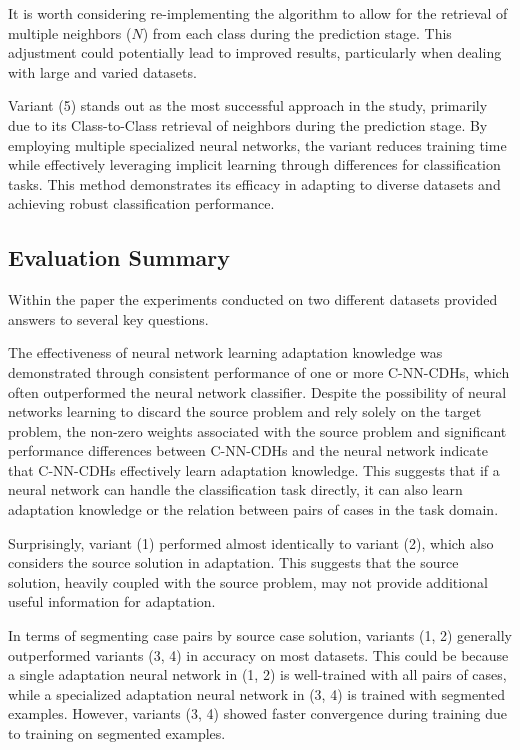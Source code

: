 \documentclass[a4paper, 12pt]{report}
\begin{document}
It is worth considering re-implementing the algorithm to allow for the retrieval of multiple neighbors ($N$) from each class during the prediction stage. 
This adjustment could potentially lead to improved results, particularly when dealing with large and varied datasets.

Variant (5) stands out as the most successful approach in the study, primarily due to its Class-to-Class retrieval of neighbors during the prediction stage. 
By employing multiple specialized neural networks, the variant reduces training time while effectively leveraging implicit learning through differences for classification tasks.
This method demonstrates its efficacy in adapting to diverse datasets and achieving robust classification performance.
\subsection{Evaluation Summary}
Within the paper \cite{ye2021learning} the experiments conducted on two different datasets provided answers to several key questions.

The effectiveness of neural network learning adaptation knowledge was demonstrated through consistent performance of one or more C-NN-CDHs,
which often outperformed the neural network classifier. Despite the possibility of neural networks learning to discard the source problem and rely solely on the target problem,
the non-zero weights associated with the source problem and significant performance differences between C-NN-CDHs and the neural network indicate that C-NN-CDHs effectively learn adaptation knowledge.
This suggests that if a neural network can handle the classification task directly, it can also learn adaptation knowledge or the relation between pairs of cases in the task domain.

Surprisingly, variant (1) performed almost identically to variant (2),
which also considers the source solution in adaptation.
This suggests that the source solution, heavily coupled with the source problem, may not provide additional useful information for adaptation.

In terms of segmenting case pairs by source case solution, variants (1, 2) generally outperformed variants (3, 4) in accuracy on most datasets.
This could be because a single adaptation neural network in (1, 2) is well-trained with all pairs of cases, while a specialized adaptation neural network in (3, 4) is trained with segmented examples.
However, variants (3, 4) showed faster convergence during training due to training on segmented examples.
\end{document}
